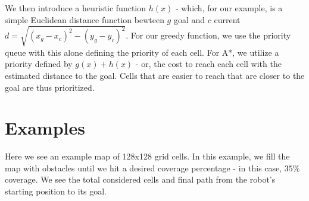 \documentclass{article}
\begin{document}
We then introduce a heuristic function $h(x)$ - which, for our example, is a simple Euclidean distance function bewteen $g$ goal and $c$ current $d = \sqrt{(x_g - x_c)^2 - (y_g - y_c)^2}$. For our greedy function, we use the priority queue with this alone defining the priority of each cell. For A*, we utilize a priority defined by $g(x) + h(x)$ - or, the cost to reach each cell with the estimated distance to the goal. Cells that are easier to reach that are closer to the goal are thus prioritized.

\section*{Examples}
Here we see an example map of 128x128 grid cells. In this example, we fill the map with obstacles until we hit a desired coverage percentage - in this case, $ 35\% $ coverage. We see the total considered cells and final path from the robot's starting position to its goal.
\end{document}
